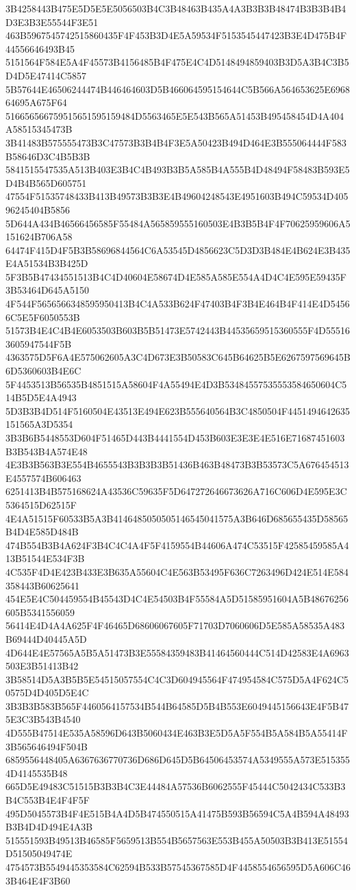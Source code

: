 {{{{{{{{{{{{{{{{{{{{{3B4258443B475E5D5E5E5056503B4C3B48463B435A4A3B3B3B48474B3B3B4B4D3E3B3E55544F3E51
463B5967545742515860435F4F453B3D4E5A59534F5153545447423B3E4D475B4F44556646493B45
5151564F584E5A4F45573B4156485B4F475E4C4D5148494859403B3D5A3B4C3B5D4D5E47414C5857
5B57644E46506244474B446464603D5B466064595154644C5B566A564653625E696864695A675F64
516656566759515651595159484D5563465E5E543B565A51453B495458454D4A404A58515345473B
3B41483B575555473B3C47573B3B4B4F3E5A50423B494D464E3B555064444F583B58646D3C4B5B3B
5841515547535A513B403E3B4C4B493B3B5A585B4A555B4D48494F58483B593E5D4B4B565D605751
47554F51535748433B413B49573B3B3E4B49604248543E4951603B494C59534D40596245404B5856
5D644A434B46566456585F55484A565859555160503E4B3B5B4F4F70625959606A5151624B706A58
64474F415D4F5B3B58696844564C6A53545D4856623C5D3D3B484E4B624E3B435E4A51534B3B425D
5F3B5B47434551513B4C4D40604E58674D4E585A585E554A4D4C4E595E59435F3B53464D645A5150
4F544F5656566348595950413B4C4A533B624F47403B4F3B4E464B4F414E4D54566C5E5F6050553B
51573B4E4C4B4E6053503B603B5B51473E5742443B44535659515360555F4D555163605947544F5B
4363575D5F6A4E575062605A3C4D673E3B50583C645B64625B5E6267597569645B6D5360603B4E6C
5F4453513B56535B4851515A58604F4A55494E4D3B53484557535553584650604C514B5D5E4A4943
5D3B3B4D514F5160504E43513E494E623B555640564B3C4850504F4451494642635151565A3D5354
3B3B6B5448553D604F51465D443B4441554D453B603E3E3E4E516E71687451603B3B543B4A574E48
4E3B3B563B3E554B4655543B3B3B3B51436B463B48473B3B53573C5A676454513E4557574B606463
6251413B4B575168624A43536C59635F5D647272646673626A716C606D4E595E3C5364515D62515F
4E4A51515F60533B5A3B4146485050505146545041575A3B646D685655435D58565B4D4E585D484B
474B554B3B4A624F3B4C4C4A4F5F4159554B44606A474C53515F42585459585A413B51544E534F3B
4C535F4D4E423B433E3B635A55604C4E563B53495F636C7263496D424E514E584358443B60625641
454E5E4C504459554B45543D4C4E54503B4F55584A5D51585951604A5B48676256605B5341556059
56414E4D4A4A625F4F46465D68606067605F71703D7060606D5E585A58535A483B69444D40445A5D
4D644E4E57565A5B5A51473B3E55584359483B41464560444C514D42583E4A6963503E3B51413B42
3B58514D5A3B5B5E54515057554C4C3D604945564F474954584C575D5A4F624C50575D4D405D5E4C
3B3B3B583B565F4460564157534B544B64585D5B4B553E6049445156643E4F5B475E3C3B543B4540
4D555B47514E535A58596D643B5060434E463B3E5D5A5F554B5A584B5A55414F3B565646494F504B
6859556448405A6367636770736D686D645D5B64506453574A5349555A573E5153554D4145535B48
665D5E49483C51515B3B3B4C3E44484A57536B6062555F45444C5042434C533B3B4C553B4E4F4F5F
495D5045573B4F4E515B4A4D5B474550515A41475B593B56594C5A4B594A48493B3B4D4D494E4A3B
515551593B49513B46585F5659513B554B5657563E553B455A50503B3B413E51554D51505049474E
4754573B5549445353584C62594B533B57545367585D4F4458554656595D5A606C463B464E4F3B60
}}}}}}}}}}}}}}}}}}}}}
